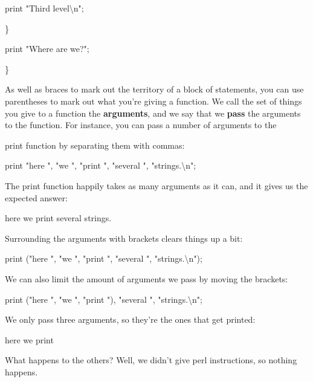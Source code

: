 \documentclass[a4paper,11pt]{book}
\begin{document}
\noindent print "Third level\textbackslash n";

\noindent \}

\noindent print "Where are we?";

\noindent \}

\noindent 

\noindent As well as braces to mark out the territory of a block of statements, you can use parentheses to mark out what you're giving a function. We call the set of things you give to a function the \textbf{arguments}, and we say that we \textbf{pass }the arguments to the function. For instance, you can pass a number of arguments to the

\noindent print function by separating them with commas:

\noindent 

\noindent 

\noindent print "here ", "we ", "print ", "several ", "strings.\textbackslash n";

\noindent 

\noindent The print function happily takes as many arguments as it can, and it gives us the expected answer:

\noindent 

\noindent here we print several strings.

\noindent 

\noindent Surrounding the arguments with brackets clears things up a bit:

\noindent 

\noindent print ("here ", "we ", "print ", "several ", "strings.\textbackslash n");

\noindent 

\noindent 

\noindent We can also limit the amount of arguments we pass by moving the brackets:

\noindent 

\noindent 

\noindent print ("here ", "we ", "print "), "several ", "strings.\textbackslash n";

\noindent 

\noindent We only pass three arguments, so they're the ones that get printed:

\noindent 

\noindent here we print

\noindent 

\noindent What  happens to  the others?  Well,  we  didn't  give  perl  instructions,  so  nothing  happens.
\end{document}
